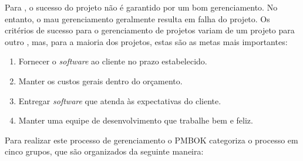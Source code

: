 \documentclass[
	12pt,
	openright,
	twoside,
	a4paper,
	english,
	brazil
	]{abntex2}
\begin{document}
Para , o sucesso do projeto não é garantido por um bom gerenciamento. No entanto, o mau gerenciamento geralmente resulta em falha do projeto. Os critérios de sucesso para o gerenciamento de projetos variam de um projeto para outro \cite{Pressman_2014}, mas, para a maioria dos projetos, estas são as metas mais importantes:

\begin{enumerate}
  \item Fornecer o \textit{software} ao cliente no prazo estabelecido.
  \item Manter os custos gerais dentro do orçamento.
  \item Entregar \textit{software} que atenda às expectativas do cliente.
  \item Manter uma equipe de desenvolvimento que trabalhe bem e feliz.
\end{enumerate}

Para realizar este processo de gerenciamento o PMBOK \cite{PMBOK} categoriza o processo em cinco grupos, que são organizados da seguinte maneira:
\end{document}
